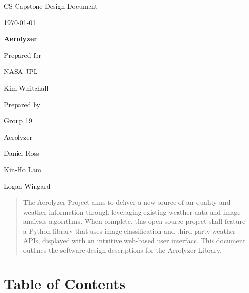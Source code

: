\documentclass[onecolumn, draftclsnofoot,10pt, compsoc]{IEEEtran}
\def \CapstoneTeamName{		Aerolyzer}
\def \CapstoneTeamNumber{		19}
\def \GroupMemberOne{			Daniel Ross}
\def \GroupMemberTwo{			Kin-Ho Lam}
\def \GroupMemberThree{			Logan Wingard}
\def \CapstoneProjectName{		Aerolyzer}
\def \CapstoneSponsorCompany{	NASA JPL}
\def \CapstoneSponsorPerson{		Kim Whitehall}
\def \DocType{		%
	Design Document
}
\newcommand{\NameSigPair}[1]{\par
	\makebox[2.75in][r]{#1} \hfil 	\makebox[3.25in]{\makebox[2.25in]{\hrulefill} \hfill		\makebox[.75in]{\hrulefill}}
	\par\vspace{-12pt} \textit{\tiny\noindent
		\makebox[2.75in]{} \hfil		\makebox[3.25in]{\makebox[2.25in][r]{Signature} \hfill	\makebox[.75in][r]{Date}}}}
\renewcommand{\NameSigPair}[1]{#1}
\begin{document}
	\begin{titlepage}
		\begin{singlespace}
			\hfill 
			\par\vspace{.2in}
			\centering
			\scshape{
				\huge CS Capstone \DocType \par
				{\large\today}\par
				\vspace{.5in}
				\textbf{\Huge\CapstoneProjectName}\par
				\vfill
				{\large Prepared for}\par
				\Huge \CapstoneSponsorCompany\par
				\vspace{5pt}
				{\Large\NameSigPair{\CapstoneSponsorPerson}\par}
				{\large Prepared by }\par
				Group\CapstoneTeamNumber\par
				\CapstoneTeamName\par 
				\vspace{5pt}
				{\large
					\NameSigPair{\GroupMemberOne}\par
					\NameSigPair{\GroupMemberTwo}\par
					\NameSigPair{\GroupMemberThree}\par
				}
				\vspace{20pt}
			}
			\begin{abstract}  
				The Aerolyzer Project aims to deliver a new source of air quality and weather information through leveraging existing weather data and image analysis algorithms.
				When complete, this open-source project shall feature a Python library that uses image classification and third-party weather APIs, displayed with an intuitive web-based user interface.
				This document outlines the software design descriptions for the Aerolyzer Library. 
			\end{abstract}     
		\end{singlespace}
	\end{titlepage}

\section{Table of Contents}
\tableofcontents


\clearpage
\end{document}

